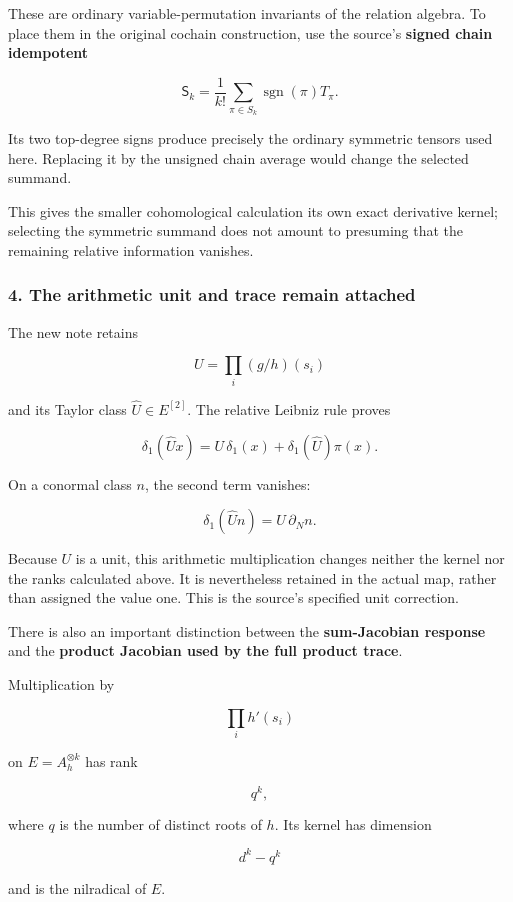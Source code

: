 These are ordinary variable-permutation invariants of the relation algebra. To place them in the
original cochain construction, use the source's \textbf{signed chain idempotent}

\[
\mathsf S_k=\frac1{k!}\sum_{\pi\in S_k}\operatorname{sgn}(\pi)T_\pi.
\]

Its two top-degree signs produce precisely the ordinary symmetric tensors used here. Replacing it by
the unsigned chain average would change the selected summand.

This gives the smaller cohomological calculation its own exact derivative kernel; selecting the
symmetric summand does not amount to presuming that the remaining relative information vanishes.

\subsubsection{4. The arithmetic unit and trace remain
attached}\label{conormal_tower_pasted:the-arithmetic-unit-and-trace-remain-attached}

The new note retains

\[
U=\prod_i(g/h)(s_i)
\]

and its Taylor class \(\widehat U\in E^{[2]}\). The relative Leibniz rule proves

\[
\boxed{
\delta_1(\widehat Ux)
=
U\,\delta_1(x)+\delta_1(\widehat U)\pi(x).
}
\]

On a conormal class \(n\), the second term vanishes:

\[
\boxed{
\delta_1(\widehat Un)
=
U\,\partial_Nn.
}
\]

Because \(U\) is a unit, this arithmetic multiplication changes neither the kernel nor the ranks
calculated above. It is nevertheless retained in the actual map, rather than assigned the value one.
This is the source's specified unit correction.

There is also an important distinction between the \textbf{sum-Jacobian response} and the
\textbf{product Jacobian used by the full product trace}.

Multiplication by

\[
\prod_i h'(s_i)
\]

on \(E=A_h^{\otimes k}\) has rank

\[
\boxed{q^k,}
\]

where \(q\) is the number of distinct roots of \(h\). Its kernel has dimension

\[
d^k-q^k
\]

and is the nilradical of \(E\).

